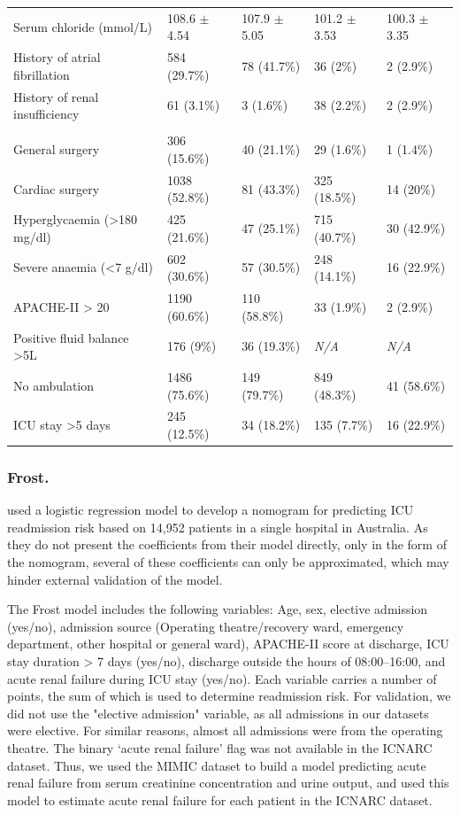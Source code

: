 \documentclass[onecolumn]{article}
\begin{document}
\begin{table}
\begin{tabular}{lp{2.5cm}p{3cm}p{2.5cm}p{3cm}}
		Serum chloride (mmol/L) & 108.6 $ \pm $ 4.54 & 107.9 $\pm$ 5.05 & 101.2 $\pm$ 3.53 & 100.3 $\pm$ 3.35 \\
		History of atrial fibrillation& 584 (29.7\%) &  78 (41.7\%) & 36 (2\%) & 2 (2.9\%) \\
		History of renal insufficiency &61 (3.1\%) & 3 (1.6\%) & 38 (2.2\%) & 2 (2.9\%) \\
		\cite{Hammer2020}&&&&\\%
		General surgery & 306 (15.6\%) & 40 (21.1\%) & 29 (1.6\%) & 1 (1.4\%) \\
		Cardiac surgery & 1038 (52.8\%) & 81 (43.3\%) & 325 (18.5\%) & 14 (20\%) \\
		Hyperglycaemia (>180 mg/dl) & 425 (21.6\%) & 47 (25.1\%) & 715 (40.7\%) & 30 (42.9\%) \\
		Severe anaemia (<7 g/dl) & 602 (30.6\%) & 57 (30.5\%) & 248 (14.1\%) & 16 (22.9\%) \\
		APACHE-II > 20 &  1190 (60.6\%) &  110 (58.8\%) & 33 (1.9\%) & 2 (2.9\%) \\
		Positive fluid balance >5L & 176 (9\%)  & 36 (19.3\%) & \textit{N/A} & \textit{N/A} \\
		No ambulation & 1486 (75.6\%) & 149 (79.7\%) & 849 (48.3\%) & 41 (58.6\%) \\
		ICU stay >5 days & 245 (12.5\%) &  34 (18.2\%) & 135 (7.7\%) & 16 (22.9\%) \\
		\hline
	\end{tabular}
	\label{Table1}
\end{table}


\subsubsection*{Frost.}

\cite{Frost2010} used a logistic regression model to develop a nomogram for predicting ICU readmission risk based on 14,952 patients in a single hospital in Australia. As they do not present the coefficients from their model directly, only in the form of the nomogram, several of these coefficients can only be approximated, which may hinder external validation of the model.

The Frost model includes the following variables: Age, sex, elective admission (yes/no), admission source (Operating theatre/recovery ward, emergency department, other hospital or general ward), APACHE-II score at discharge, ICU stay duration > 7 days (yes/no), discharge outside the hours of 08:00--16:00, and acute renal failure during ICU stay (yes/no). Each variable carries a number of points, the sum of which is used to determine readmission risk. For validation, we did not use the "elective admission" variable, as all admissions in our datasets were elective. For similar reasons, almost all admissions were from the operating theatre.  The binary `acute renal failure' flag was not available in the ICNARC dataset. Thus, we used the MIMIC dataset to build a model predicting acute renal failure from serum creatinine concentration and urine output, and used this model to estimate acute renal failure for each patient in the ICNARC dataset.
\end{document}
